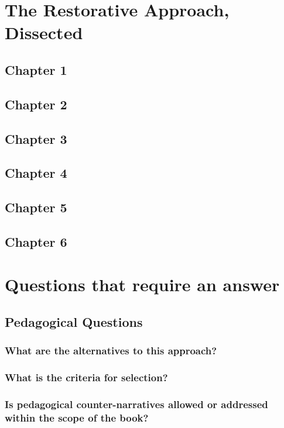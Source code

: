 \documentclass[12pt]{article}
\begin{document}
	\section{The Restorative Approach, Dissected}
	\subsection{Chapter 1}
	\subsection{Chapter 2}
	\subsection{Chapter 3}
	\subsection{Chapter 4}
	\subsection{Chapter 5}
	\subsection{Chapter 6}

	\section{Questions that require an answer}
	\subsection{Pedagogical Questions}
	\subsubsection{What are the alternatives to this approach?}
	\subsubsection{What is the criteria for selection?}
	\subsubsection{Is pedagogical counter-narratives allowed or addressed within the scope of the book?}
\end{document}
